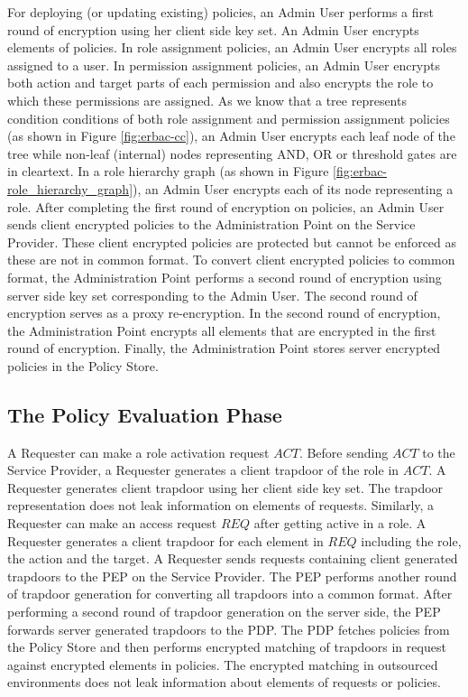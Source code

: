 \documentclass[epsfig,a4paper,11pt,titlepage]{book}
\numberwithin{algorithm}{chapter}
\begin{document}
For deploying (or updating existing) policies, an Admin User performs a first round of encryption using her client side key set. An Admin User encrypts elements of policies. In role assignment policies, an Admin User encrypts all roles assigned to a user. In permission assignment policies, an Admin User encrypts both action and target parts of each permission and also encrypts the role to which these permissions are assigned. As we know that a tree represents condition conditions of both role assignment and permission assignment policies (as shown in Figure \ref{fig:erbac-cc}), an Admin User encrypts each leaf node of the tree while non-leaf (internal) nodes representing AND, OR or threshold gates are in cleartext. In a role hierarchy graph (as shown in Figure \ref{fig:erbac-role_hierarchy_graph}), an Admin User encrypts each of its node representing a role. After completing the first round of encryption on policies, an Admin User sends client encrypted policies to the Administration Point on the Service Provider. These client encrypted policies are protected but cannot be enforced as these are not in common format. To convert client encrypted policies to common format, the Administration Point performs a second round of encryption using server side key set corresponding to the Admin User. The second round of encryption serves as a proxy re-encryption. In the second round of encryption, the Administration Point encrypts all elements that are encrypted in the first round of encryption. Finally, the Administration Point stores server encrypted policies in the Policy Store.

\subsection{The Policy Evaluation Phase}
A Requester can make a role activation request $\mathit{ACT}$. Before sending $\mathit{ACT}$ to the Service Provider, a Requester generates a client trapdoor of the role in $\mathit{ACT}$. A Requester generates client trapdoor using her client side key set. The trapdoor representation does not leak information on elements of requests. Similarly, a Requester can make an access request $\mathit{REQ}$ after getting active in a role. A Requester generates a client trapdoor for each element in $\mathit{REQ}$ including the role, the action and the target. A Requester sends requests containing client generated trapdoors to the \gls{PEP} on the Service Provider. The \gls{PEP} performs another round of trapdoor generation for converting all trapdoors into a common format. After performing a second round of trapdoor generation on the server side, the \gls{PEP} forwards server generated trapdoors to the \gls{PDP}. The \gls{PDP} fetches policies from the Policy Store and then performs encrypted matching of trapdoors in request against encrypted elements in policies. The encrypted matching in outsourced environments does not leak information about elements of requests or policies. 
\end{document}
